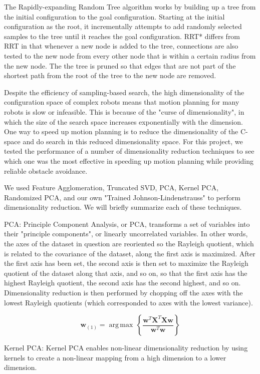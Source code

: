 \documentclass[12pt]{article}
\begin{document}
The Rapidly-expanding Random Tree algorithm works by building up a tree from the initial configuration to the goal configuration. Starting at the initial configuration as the root, it incrementally attempts to add randomly selected samples to the tree until it reaches the goal configuration. RRT* differs from RRT in that whenever a new node is added to the tree, connections are also tested to the new node from every other node that is within a certain radius from the new node. The the tree is pruned so that edges that are not part of the shortest path from the root of the tree to the new node are removed. 

Despite the efficiency of sampling-based search, the high dimensionality of the
configuration space of complex robots means that motion planning for many
robots is slow or infeasible. This is because of the "curse of dimensionality",
in which the size of the search space increases exponentially with the
dimension. One way to speed up motion planning is to reduce the dimensionality
of the C-space and do search in this reduced dimensionality space. For this
project, we tested the performance of a number of dimensionality reduction
techniques to see which one was the most effective in speeding up motion
planning while providing reliable obstacle avoidance.

We used Feature Agglomeration, Truncated SVD, PCA, Kernel PCA, Randomized PCA, and
our own "Trained Johnson-Lindenstrauss" to perform dimensionality reduction. We will briefly summarize each of these techniques.

PCA: Principle Component Analysis, or PCA, transforms a set of variables into 
their "principle components", or linearly uncorrelated variables. In other words, the axes of the dataset in question are reoriented so the Rayleigh quotient, which is related to the covariance of the dataset, along the first axis is maximized. After the first axis has been set, the second axis is then set to maximize the Rayleigh quotient of the dataset along that axis, and so on, so that the first axis has the highest Rayleigh quotient, the second axis has the second highest, and so on. Dimensionality reduction is then performed by chopping off the axes with the lowest Rayleigh quotients (which corresponded to axes with the lowest variance).

$$
\mathbf{w}_{(1)} = {\operatorname{\arg\,max}}\, \left\{ \frac{\mathbf{w}^T\mathbf{X}^T \mathbf{X w}}{\mathbf{w}^T \mathbf{w}} \right\}
$$

Kernel PCA: Kernel PCA enables non-linear dimensionality reduction by using kernels to create a non-linear mapping from a high dimension to a lower dimension.
\end{document}
